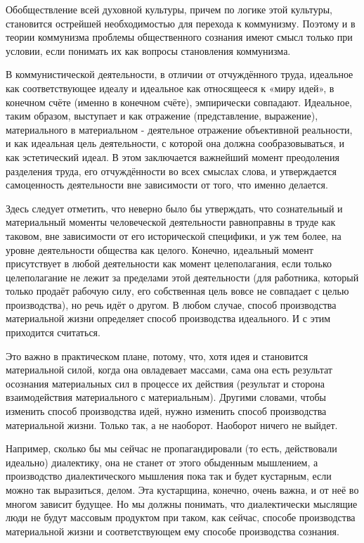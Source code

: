 \documentclass[../main]{subfiles}
\begin{document}
Обобществление всей духовной культуры, причем по логике этой культуры, становится острейшей необходимостью для перехода к коммунизму. Поэтому и в теории коммунизма проблемы общественного сознания имеют смысл только при условии, если понимать их как вопросы становления коммунизма.

В коммунистической деятельности, в отличии от отчуждённого труда, идеальное как соответствующее идеалу и идеальное как относящееся к «миру идей», в конечном счёте (именно в конечном счёте), эмпирически совпадают. Идеальное, таким образом, выступает и как отражение (представление, выражение), материального в материальном - деятельное отражение объективной реальности, и как идеальная цель деятельности, с которой она должна сообразовываться, и как эстетический идеал. В этом заключается важнейший момент преодоления разделения труда, его отчуждённости во всех смыслах слова, и утверждается самоценность деятельности вне зависимости от того, что именно делается.

Здесь следует отметить, что неверно было бы утверждать, что сознательный и материальный моменты человеческой деятельности равноправны в труде как таковом, вне зависимости от его исторической специфики, и уж тем более, на уровне деятельности общества как целого. Конечно, идеальный момент присутствует в любой деятельности как момент целеполагания, если только целеполагание не лежит за пределами этой деятельности (для работника, который только продаёт рабочую силу, его собственная цель вовсе не совпадает с целью производства), но речь идёт о другом. В любом случае, способ производства материальной жизни определяет способ производства идеального. И с этим приходится считаться.

Это важно в практическом плане, потому, что, хотя идея и становится материальной силой, когда она овладевает массами, сама она есть результат осознания материальных сил в процессе их действия (результат и сторона взаимодействия материального с материальным). Другими словами, чтобы изменить способ производства идей, нужно изменить способ производства материальной жизни. Только так, а не наоборот. Наоборот ничего не выйдет.

Например, сколько бы мы сейчас не пропагандировали (то есть, действовали идеально) диалектику, она не станет от этого обыденным мышлением, а производство диалектического мышления пока так и будет кустарным, если можно так выразиться, делом. Эта кустарщина, конечно, очень важна, и от неё во многом зависит будущее. Но мы должны понимать, что диалектически мыслящие люди не будут массовым продуктом при таком, как сейчас, способе производства материальной жизни и соответствующем ему способе производства сознания.
\end{document}
